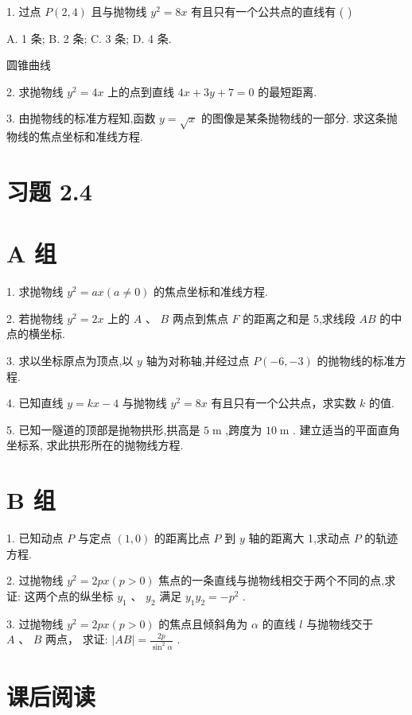 \documentclass[10pt]{article}
\begin{document}
1. 过点 \(P\left( {2,4}\right)\) 且与抛物线 \({y}^{2} = {8x}\) 有且只有一个公共点的直线有 ( )

A. 1 条; B. 2 条; C. 3 条; D. 4 条.

圆锥曲线

2. 求抛物线 \({y}^{2} = {4x}\) 上的点到直线 \({4x} + {3y} + 7 = 0\) 的最短距离.

3. 由抛物线的标准方程知,函数 \(y = \sqrt{x}\) 的图像是某条抛物线的一部分. 求这条抛物线的焦点坐标和准线方程.

\section*{习题 2.4}

\section*{A 组}

1. 求抛物线 \({y}^{2} = {ax}\left( {a \neq  0}\right)\) 的焦点坐标和准线方程.

2. 若抛物线 \({y}^{2} = {2x}\) 上的 \(A\) 、 \(B\) 两点到焦点 \(F\) 的距离之和是 5,求线段 \({AB}\) 的中点的横坐标.

3. 求以坐标原点为顶点,以 \(y\) 轴为对称轴,并经过点 \(P\left( {-6, - 3}\right)\) 的抛物线的标准方程.

4. 已知直线 \(y = {kx} - 4\) 与抛物线 \({y}^{2} = {8x}\) 有且只有一个公共点，求实数 \(k\) 的值.

5. 已知一隧道的顶部是抛物拱形,拱高是 \(5\mathrm{\;m}\) ,跨度为 \({10}\mathrm{\;m}\) . 建立适当的平面直角坐标系, 求此拱形所在的抛物线方程.

\section*{B 组}

1. 已知动点 \(P\) 与定点 \(\left( {1,0}\right)\) 的距离比点 \(P\) 到 \(y\) 轴的距离大 1,求动点 \(P\) 的轨迹方程.

2. 过抛物线 \({y}^{2} = {2px}\left( {p > 0}\right)\) 焦点的一条直线与抛物线相交于两个不同的点,求证: 这两个点的纵坐标 \({y}_{1}\text{ 、 }{y}_{2}\) 满足 \({y}_{1}{y}_{2} =  - {p}^{2}\) .

3. 过抛物线 \({y}^{2} = {2px}\left( {p > 0}\right)\) 的焦点且倾斜角为 \(\alpha\) 的直线 \(l\) 与抛物线交于 \(A\text{ 、 }B\) 两点， 求证: \(\left| {AB}\right|  = \frac{2p}{{\sin }^{2}\alpha }\) .

\section*{课后阅读}
\end{document}
